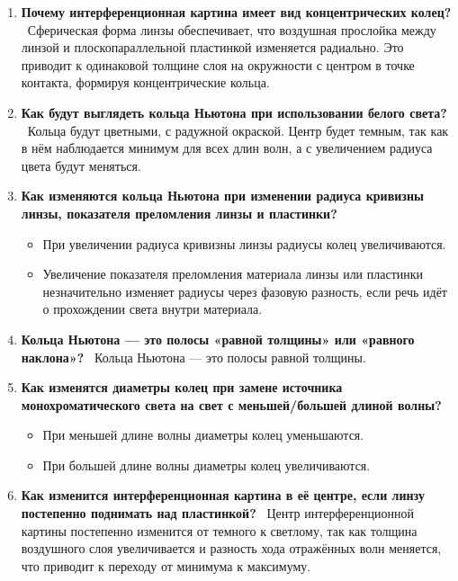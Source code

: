 \documentclass[14pt, a4paper, twoside]{extreport}
\begin{document}
\begin{enumerate}
  \item \textbf{Почему интерференционная картина имеет вид концентрических колец?} \
    Сферическая форма линзы обеспечивает, что воздушная прослойка между линзой и плоскопараллельной пластинкой изменяется радиально. Это приводит к одинаковой толщине слоя на окружности с центром в точке контакта, формируя концентрические кольца.

  \item \textbf{Как будут выглядеть кольца Ньютона при использовании белого света?} \
    Кольца будут цветными, с радужной окраской. Центр будет темным, так как в нём наблюдается минимум для всех длин волн, а с увеличением радиуса цвета будут меняться.

  \item \textbf{Как изменяются кольца Ньютона при изменении радиуса кривизны линзы, показателя преломления линзы и пластинки?} \
    \begin{itemize}
      \item При увеличении радиуса кривизны линзы радиусы колец увеличиваются.
      \item Увеличение показателя преломления материала линзы или пластинки незначительно изменяет радиусы через фазовую разность, если речь идёт о прохождении света внутри материала.
    \end{itemize}

  \item \textbf{Кольца Ньютона — это полосы «равной толщины» или «равного наклона»?} \
    Кольца Ньютона — это полосы равной толщины.

  \item \textbf{Как изменятся диаметры колец при замене источника монохроматического света на свет с меньшей/большей длиной волны?} \
    \begin{itemize}
      \item При меньшей длине волны диаметры колец уменьшаются.
      \item При большей длине волны диаметры колец увеличиваются.
    \end{itemize}

  \item \textbf{Как изменится интерференционная картина в её центре, если линзу постепенно поднимать над пластинкой?} \
    Центр интерференционной картины постепенно изменится от темного к светлому, так как толщина воздушного слоя увеличивается и разность хода отражённых волн меняется, что приводит к переходу от минимума к максимуму.
\end{enumerate}
\end{document}
